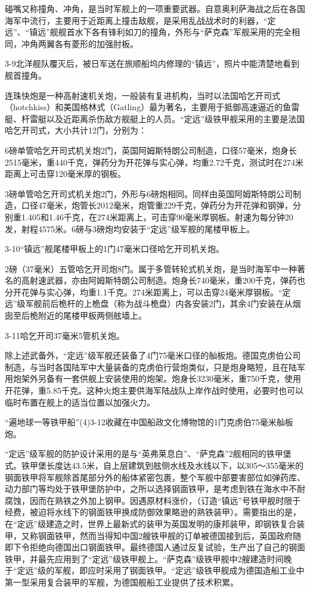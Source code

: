 \documentclass[12pt,UTF8]{ctexbook}
\begin{document}
碰嘴又称撞角、冲角，是当时军舰上的一项重要武器。自意奥利萨海战之后在各国海军中流行，主要用于近距离上撞击敌舰，是采用乱战战术时的利器，“定远”、“镇远”舰舰首水下各有锋利如刀的撞角，外形与“萨克森”军舰采用的完全相同，冲角两翼各有菱形的加强肘板。

3-9北洋舰队覆灭后，被日军送在旅顺船坞内修理的“镇远”，照片中能清楚地看到舰首撞角。

连珠快炮是一种高射速机关炮，一般装有复进机构，当时以法国哈乞开司式（hotchkiss）和美国格林式（Gatling）最为著名，主要用于抵御高速逼近的鱼雷艇、杆雷艇以及近距离杀伤敌方舰艇上的人员。“定远”级铁甲舰采用的主要是法国哈乞开司式，大小共计12门，分别为：

6磅单管哈乞开司式机关炮2门，英国阿姆斯特朗公司制造，口径57毫米，炮身长2515毫米，重440千克，弹药分为开花弹与实心弹，均重2.72千克，测试时在274米距离上可击穿120毫米厚的钢板。

3磅单管哈乞开司式机关炮2门，外形与6磅炮相同。同样由英国阿姆斯特朗公司制造，口径47毫米，炮管长2012毫米，炮管重229千克，弹药分为开花弹和钢弹，分别重1.405和1.46千克，在274米距离上，可击穿90毫米厚钢板。射速为每分钟20发，射程4575米。6磅与3磅炮均安装于“定远”级军舰的尾楼甲板上。

3-10“镇远”舰尾楼甲板上的1门47毫米口径哈乞开司机关炮。

2磅（37毫米）五管哈乞开司炮8门。属于多管转轮式机关炮，是当时海军中一种著名的高射速武器，亦由阿姆斯特朗公司制造。炮身长740毫米，重200千克，弹药也分开花弹与实心弹，均重1.1千克。274米距离上，可以击穿24毫米厚钢板。“定远”级军舰前后桅杆的上桅盘（称为战斗桅盘）内各安装2门，其余4门安装在从烟囱至后桅附近的尾楼甲板两侧舷墙上。

3-11哈乞开司37毫米5管机关炮。

除上述武备外，“定远”级军舰还装备了4门75毫米口径的舢板炮。德国克虏伯公司制造，与当时各国陆军中大量装备的克虏伯行营炮类似，只是炮身略短，且在陆军用炮架外另备有一套供舰上安装使用的炮架。炮身长3230毫米，重750千克，使用开花弹，重5.85千克。这种火炮主要供海军陆战队上岸作战时使用，必要时也可以临时布置在舰上的适当位置以加强火力。

“遍地球一等铁甲船”(4)3-12收藏在中国船政文化博物馆的1门克虏伯75毫米舢板炮。

“定远”级军舰的防护设计采用的是与“英弗莱息白”、“萨克森”2舰相同的铁甲堡式。铁甲堡长度达43.5米，自上层建筑到舷侧水线及水线以下，以305～355毫米的钢面铁甲将军舰除首尾部分外的船体紧密包裹，整个军舰中部要害部位如弹药库、动力部门等均处于铁甲堡防护中，之所以选择钢面铁甲，是考虑到铁在海水中不耐腐蚀，因而在熟铁之外加上钢甲。因遇原材料涨价，（订造“镇远”号铁甲舰时限于经费，被迫将水线下的钢面铁甲换成防御效果略逊的熟铁装甲）。需要指出的是，在“定远”级建造之时，世界上最新式的装甲为英国发明的康邦装甲，即钢铁复合装甲，又称钢面铁甲，然而当得知中国2艘铁甲舰的订单被德国接到后，英国政府随即下令拒绝向德国出口钢面铁甲。最终德国人通过反复试验，生产出了自己的钢面铁甲，并最先应用到了“定远”级铁甲舰上。“萨克森”级铁甲舰中2艘建造时间晚于“定远”级的军舰，即应时采用了钢面铁甲。“定远”级铁甲舰成为德国造船工业中第一型采用复合装甲的军舰，为德国舰船工业提供了技术积累。
\end{document}
